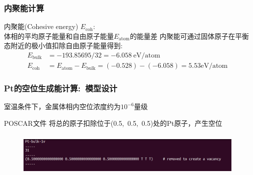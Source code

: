 \frame
{
	\frametitle{内聚能计算}
内聚能\textrm{(Cohesive energy) $E_{\mathrm{coh}}$}:~\\
体相的平均原子能量和自由原子能量$E_{\mathrm{atom}}$的能量差
\vskip 3pt
{\fontsize{7.5pt}{5.2pt}\selectfont{内聚能是衡量原子构成固体时原子间相互作用强弱的参数}}%
\vskip 5pt
内聚能可通过固体原子在平衡态附近的极小值扣除自由原子能量得到:%
\begin{displaymath}
	\begin{aligned}
		E_{\mathrm{bulk}}&=-193.85695/32=-6.058~\mathrm{eV/atom}\\
		E_{\mathrm{coh}}&=E_{\mathrm{atom}}-E_{\mathrm{bulk}}=(-0.528)-(-6.058)=5.53\mathrm{eV/atom}
	\end{aligned}
\end{displaymath}
{\fontsize{7.5pt}{5.2pt}}
}

\frame
{
	\frametitle{\textrm{Pt}的空位生成能计算:~模型设计}
室温条件下，金属体相内空位浓度约为$10^{-6}$量级
\vskip 5pt
{\fontsize{7.5pt}{5.2pt}\selectfont{显然不可能为了模拟一个空位，就用$10^6$量级的超晶胞。合理的做法应该是选择合适尺度的超晶胞并设计原子空位，要求超晶胞间空位相互作用可以忽略，由此计算晶格中的空位能}}%

\textrm{POSCAR}文件%
将总的原子扣除位于(0.5,~0.5,~0.5)处的\textrm{Pt}原子，产生空位%
\begin{figure}[h!]
\centering
\vskip -3pt
\includegraphics[height=0.85in,viewport=0 15 750 120,clip]{Figures/Pt_vacancy-POSCAR.png}
\caption{\fontsize{6.2pt}{5.2pt}}%
\label{Pt_vacancy-POSCAR}
\end{figure}
}

